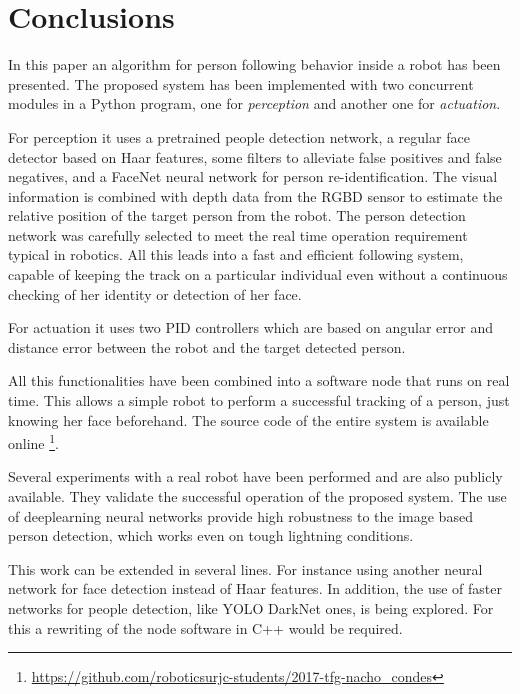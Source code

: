 \section{Conclusions}

In this paper an algorithm for person following behavior inside a robot has been presented. 
The proposed system has been implemented with two concurrent modules in a Python program, one for \emph{perception} and another one for \emph{actuation}. 

For perception it uses a pretrained people detection network, a regular face detector based on Haar features, some filters to alleviate false positives and false negatives, and a FaceNet neural network for person re-identification. The visual information is combined with depth data from the RGBD sensor to estimate the relative position of the target person from the robot. The person detection network was carefully selected to meet the real time operation requirement typical in robotics. All this leads into a fast and efficient following system, capable of keeping the track on a particular individual even without a continuous checking of her identity or detection of her face. 

For actuation it uses two PID controllers which are based on angular error and distance error between the robot and the target detected person.

All this functionalities have been combined into a software node that runs on real time. This allows a simple robot to perform a successful tracking of a person, just knowing her face beforehand. The source code of the entire system is available online \footnote{\url{https://github.com/roboticsurjc-students/2017-tfg-nacho_condes}}.

Several experiments with a real robot have been performed and are also publicly available. They validate the successful operation of the proposed system. The use of deeplearning neural networks provide high robustness to the image based person detection, which works even on tough lightning conditions. 


This work can be extended in several lines. For instance using another neural network for face detection instead of Haar features. In addition, the use of faster networks for people detection, like YOLO DarkNet ones, is being explored. For this a rewriting of the node software in C++ would be required.
